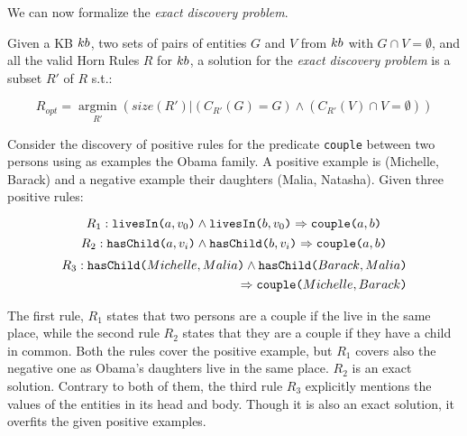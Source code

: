 We can now formalize the \emph{exact discovery problem}. %

\begin{definition}
	Given a KB ${\sc kb}$, two sets of pairs of entities $G$ and $V$ from ${\sc kb}$ with $G \cap V = \emptyset$, and all the valid Horn Rules $R$ for ${\sc kb}$, a solution for the \emph{exact discovery problem} is a subset $R'$ of $R$  s.t.:
	
	\vspace{-6mm}	
	\begin{equation*}
		R_{opt}=\underset{R'}{\operatorname{argmin}}(size(R') | (C_{R'}(G) = G) \wedge (C_{R'}(V) \cap V = \emptyset))	\end{equation*}
	\end{definition}
	\vspace{-1ex}	

\begin{example}
	Consider the discovery of positive rules for the predicate {\tt couple} between two persons using as examples the Obama family. A positive example is (Michelle, Barack) and a negative example their daughters (Malia, Natasha). 
	Given three positive rules:
	
	\vspace{-4ex}	
	{\small	
		\begin{equation*}
		R_{1}:	\texttt{livesIn(}a,v_0\texttt{)} \wedge \texttt{livesIn(}b,v_0\texttt{)} \Rightarrow  \texttt{couple(}a,b\texttt{)}  
		\end{equation*}
			\vspace{-3ex}	
		\begin{equation*}
		R_{2}:	\texttt{hasChild(}a,v_i\texttt{)} \wedge \texttt{hasChild(}b,v_i\texttt{)} \Rightarrow  \texttt{couple(}a,b\texttt{)}  
		\end{equation*}
		\vspace{-3ex}	
		\begin{equation*}
			\begin{split}
			R_{3}:	\texttt{hasChild(}Michelle,Malia\texttt{)} \wedge  \texttt{hasChild(}Barack,Malia\texttt{)} \\ \Rightarrow \texttt{couple(}Michelle,Barack\texttt{)}
			\end{split}
		\end{equation*}
	}
	\vspace{-3ex}	
	
	\noindent
	The first rule, $R_{1}$ states that two persons are a couple if the live in the same place, while the second rule $R_{2}$ states that they are a couple if they have a child in common. Both the rules cover the positive example, but $R_{1}$ covers also the negative one as Obama's daughters live in the same place. $R_{2}$ is an exact solution. Contrary to both of them, the third rule $R_{3}$ explicitly mentions the values of the entities in its head and body. Though it is also an exact solution, it overfits the given positive examples. %
\end{example} 

